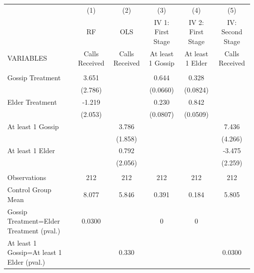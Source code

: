 \begin{tabular}{lccccc} \hline
 & (1) & (2) & (3) & (4) & (5) \\
 & RF & OLS & IV 1: First Stage & IV 2: First Stage & IV: Second Stage \\
VARIABLES & Calls Received & Calls Received & At least 1 Gossip & At least 1 Elder & Calls Received \\ \hline
 &  &  &  &  &  \\
Gossip Treatment & 3.651 &  & 0.644 & 0.328 &  \\
 & (2.786) &  & (0.0660) & (0.0824) &  \\
Elder Treatment & -1.219 &  & 0.230 & 0.842 &  \\
 & (2.053) &  & (0.0807) & (0.0509) &  \\
At least 1 Gossip &  & 3.786 &  &  & 7.436 \\
 &  & (1.858) &  &  & (4.266) \\
At least 1 Elder &  & 0.792 &  &  & -3.475 \\
 &  & (2.056) &  &  & (2.259) \\
 &  &  &  &  &  \\
Observations & 212 & 212 & 212 & 212 & 212 \\
Control Group Mean & 8.077 & 5.846 & 0.391 & 0.184 & 5.805 \\
Gossip Treatment=Elder Treatment (pval.) & 0.0300 &  & 0 & 0 &  \\
 At least 1 Gossip=At least 1 Elder (pval.) &  & 0.330 &  &  & 0.0300 \\ \hline
\end{tabular}
